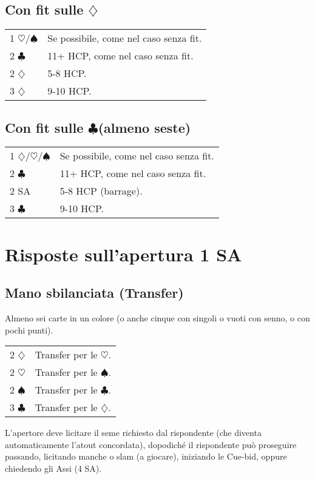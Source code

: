 \documentclass[a4paper,10pt]{article}
\renewcommand{\c}{$\clubsuit$\xspace}
\renewcommand{\d}{$\diamondsuit$\xspace}
\newcommand{\h}{$\heartsuit$\xspace}
\newcommand{\s}{$\spadesuit$\xspace}
\newcommand{\sa}{SA\xspace}
\newcommand{\smallspace}{\vskip0.3cm}
\newenvironment{twocol}
  {\smallspace\noindent\begin{tabular}{l p{0.78\textwidth}}}
  {\end{tabular}\smallspace}
\begin{document}
\subsection{Con fit sulle \d}

\begin{twocol}
 1 \h/\s & Se possibile, come nel caso senza fit.\\
 2 \c  & 11+ HCP, come nel caso senza fit.\\
 2 \d  & 5-8 HCP.\\
 3 \d  & 9-10 HCP.\\
\end{twocol}

\subsection{Con fit sulle \c (almeno seste)}

\begin{twocol}
 1 \d/\h/\s & Se possibile, come nel caso senza fit.\\
 2 \c & 11+ HCP, come nel caso senza fit.\\
 2 \sa & 5-8 HCP (barrage).\\
 3 \c & 9-10 HCP.\\
\end{twocol}



\pagebreak

\section{Risposte sull'apertura 1 SA}

\subsection{Mano sbilanciata (Transfer)}

Almeno sei carte in un colore (o anche cinque con singoli o vuoti con senno, o con pochi punti).

\begin{twocol}
 2 \d & Transfer per le \h.\\
 2 \h & Transfer per le \s.\\
 2 \s & Transfer per le \c.\\
 3 \c & Transfer per le \d.\\
\end{twocol}

L'apertore deve licitare il seme richiesto dal rispondente (che diventa automaticamente l'atout concordata), dopodiché il rispondente può proseguire passando, licitando manche o slam (a giocare), iniziando le Cue-bid, oppure chiedendo gli Assi (4 \sa).
\end{document}
